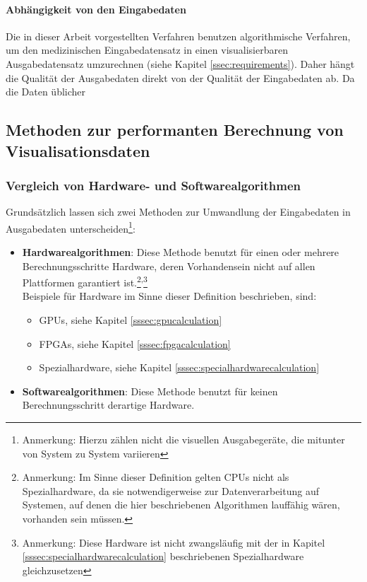\documentclass[a4paper,titlepage,12pt]{scrartcl}
\newtheorem[L]{boxedDefinition}{Definition}
\begin{document}
\paragraph{Abhängigkeit von den Eingabedaten}
Die in dieser Arbeit vorgestellten Verfahren benutzen algorithmische Verfahren, um den medizinischen Eingabedatensatz in einen visualisierbaren Ausgabedatensatz umzurechnen (siehe Kapitel \ref{ssec:requirements}). Daher hängt die Qualität der Ausgabedaten direkt von der Qualität der Eingabedaten ab. Da die Daten üblicher
\subsection{Methoden zur performanten Berechnung von Visualisationsdaten}\label{ssec:hpmethods}
\subsubsection{Vergleich von Hardware- und Softwarealgorithmen}\label{ssec:swhwcomparison}
Grundsätzlich lassen sich zwei Methoden zur Umwandlung der Eingabedaten in Ausgabedaten unterscheiden\footnote{Anmerkung: Hierzu zählen nicht die visuellen Ausgabegeräte, die mitunter von System zu System variieren}:
\begin{itemize}
 \item \textbf{Hardwarealgorithmen}: Diese Methode benutzt für einen oder mehrere Berechnungsschritte Hardware, deren Vorhandensein nicht auf allen Plattformen garantiert ist.\footnote{Anmerkung: Im Sinne dieser Definition gelten CPUs nicht als Spezialhardware, da sie notwendigerweise zur Datenverarbeitung auf Systemen, auf denen die hier beschriebenen Algorithmen lauffähig  wären, vorhanden sein müssen.}\textsuperscript{,}\footnote{Anmerkung: Diese Hardware ist nicht zwangsläufig mit der in Kapitel \ref{sssec:specialhardwarecalculation} beschriebenen Spezialhardware gleichzusetzen}\\
 Beispiele für Hardware im Sinne dieser Definition beschrieben, sind:
 \begin{itemize}
  \item GPUs, siehe Kapitel \vref{sssec:gpucalculation} 
  \item FPGAs, siehe Kapitel \vref{sssec:fpgacalculation}
  \item Spezialhardware, siehe Kapitel \vref{sssec:specialhardwarecalculation}
 \end{itemize}
 \item \textbf{Softwarealgorithmen}: Diese Methode benutzt für keinen Berechnungsschritt derartige Hardware.
\end{itemize}
\end{document}
